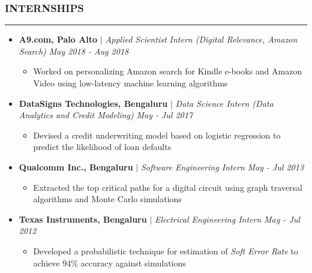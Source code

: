 \documentclass[10pt,a4paper,English]{article}
\newcommand\roottitle[1]{\vspace{-4mm}\subsubsection*{\uppercase{#1}}\vspace{-0.3em}\nopagebreak[4]\hrule\vspace{4mm}}
\newcommand\itemyear[1]{\hfill \emph{\color{itemyear} #1}}
\newcommand\itemenv{\setlength\itemsep{0.5pt} \addtolength{\itemindent}{-5mm}\vspace{-1.5mm}}
\newcommand\itemenvnoindent{\setlength\itemsep{-1pt} \vspace{-1.5mm}}
\begin{document}
\roottitle{Internships}
\begin{itemize}[leftmargin=11pt] \itemenvnoindent
        
    \item \textbf{A9.com, Palo Alto} $|$ \textit{Applied Scientist Intern (Digital Relevance, Amazon Search)} \itemyear{May 2018 - Aug 2018}
        \begin{itemize} \itemenv
            \item Worked on personalizing Amazon search for Kindle e-books and Amazon Video using low-latency machine learning algorithms
        \end{itemize}

    \item \textbf{DataSigns Technologies, Bengaluru} $|$ \textit{Data Science Intern (Data Analytics and Credit Modeling)} \itemyear{May - Jul 2017}
    \begin{itemize} \itemenv
        \item Devised a credit underwriting model based on logistic regression to predict the likelihood of loan defaults
    \end{itemize}

    \item \textbf{Qualcomm Inc., Bengaluru} $|$ \textit{Software Engineering Intern} \itemyear{May - Jul 2013}
    \begin{itemize} \itemenv
        \item Extracted the top critical paths for a digital circuit using graph traversal algorithms and Monte Carlo simulations
    \end{itemize}

    \item \textbf{Texas Instruments, Bengaluru} $|$ \textit{Electrical Engineering Intern} \itemyear{May - Jul 2012}
    \begin{itemize} \itemenv
        \item Developed a probabilistic technique for estimation of \emph{Soft Error Rate} to achieve 94\% accuracy against simulations
    \end{itemize}

    \end{itemize}
\end{document}
